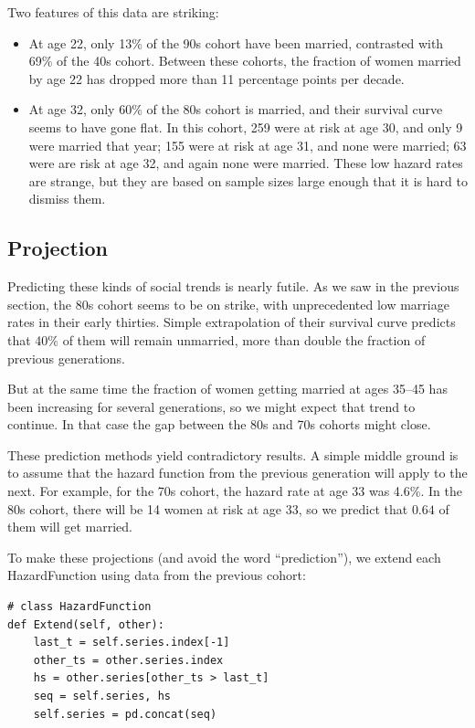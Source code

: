 \documentclass[journal]{IEEEtran}
\begin{document}
Two features of this data are striking:

\begin{itemize}
\item At age 22, only 13\% of
the 90s cohort have been married, contrasted with 69\% of the 40s cohort.
Between these cohorts, the fraction of women married by age 22
has dropped more than 11 percentage points per decade.

\item At age 32, only 60\% of the 80s cohort is married, and
their survival curve seems to have gone flat.  In this cohort,
259 were at risk at age 30, and only 9 were married that year;
155 were at risk at age 31, and none were married;
63 were are risk at age 32, and again none were married.
These low hazard rates are strange, but they are based on
sample sizes large enough that it is hard to dismiss them.

\end{itemize}


\subsection{Projection}

Predicting these kinds of social trends is
nearly futile.  As we saw in the previous section, the
80s cohort seems to be on strike, with unprecedented low marriage
rates in their early thirties.  Simple extrapolation of their
survival curve predicts that 40\% of them will remain unmarried,
more than double the fraction of previous generations.

But at the same time the fraction of women getting married at
ages 35--45 has been increasing for several generations, so we
might expect that trend to continue.  In that case the gap between
the 80s and 70s cohorts might close.

These prediction methods yield contradictory results.  A
simple middle ground is to assume that the hazard function from
the previous generation will apply to the next.  For example,
for the 70s cohort, the hazard rate at age 33 was 4.6\%.  In
the 80s cohort, there will be 14 women at risk at age 33, so
we predict that $0.64$ of them will get married.

To make these projections (and avoid the word ``prediction''),
we extend each HazardFunction using
data from the previous cohort:

\begin{verbatim}
# class HazardFunction
def Extend(self, other):
    last_t = self.series.index[-1]
    other_ts = other.series.index
    hs = other.series[other_ts > last_t]
    seq = self.series, hs
    self.series = pd.concat(seq)
\end{verbatim}
\end{document}
